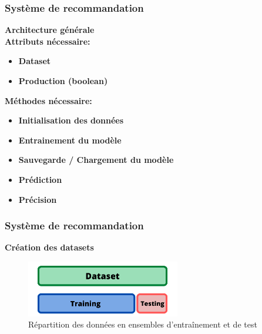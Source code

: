 \documentclass{beamer}
\begin{document}
\begin{frame}
    \scriptsize
    \frametitle{Système de recommandation}
    \vspace{0.3cm}
    {\large\textbf{Architecture générale}\\}
    \vspace{0.3cm}
    \textbf{Attributs nécessaire:}
    \begin{itemize}
        \item \textbf{Dataset}
        \item \textbf{Production (boolean)}
    \end{itemize}
    \vspace{0.3cm}
    \textbf{Méthodes nécessaire:}
    \begin{itemize}
        \item \textbf{Initialisation des données}
        \item \textbf{Entrainement du modèle}
        \item \textbf{Sauvegarde / Chargement du modèle}
        \item \textbf{Prédiction}
        \item \textbf{Précision}
    \end{itemize}
\end{frame}

\begin{frame}
    \scriptsize
    \frametitle{Système de recommandation}
    \vspace{0.3cm}
    {\large\textbf{Création des datasets}\\}
    \vspace{0.3cm}
    \begin{figure}
        \centering
        \includegraphics[width=0.60\textwidth]{trainset.png}
        \caption{Répartition des données en ensembles d'entraînement et de test}
    \end{figure}


\end{frame}
\end{document}
